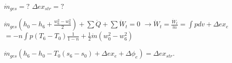 \( \dot{m}_{ges} = ? \)  
\( \Delta ex_{str} = ? \)  

\( \dot{m}_{ges} \left( h_0 - h_6 + \frac{w_6^2 - w_0^2}{2} \right) + \sum \dot{Q} + \sum \dot{W}_t = 0 \)  
\( \rightarrow \dot{W}_t = \frac{\dot{W}_t}{\dot{m}} = \int p dv + \Delta ex_e \)  
\( = -n \int p \left( T_6 - T_0 \right) \frac{1}{1-n} + \frac{1}{2} \dot{m} \left( w_0^2 - w_6^2 \right) \)  

\( \dot{m}_{ges} \left( h_6 - h_0 - T_0 \left( s_6 - s_0 \right) + \Delta ex_e + \Delta \phi_e \right) = \Delta ex_{str} \).